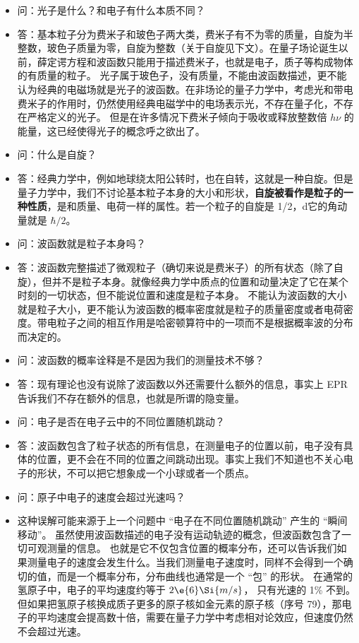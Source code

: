 \begin{itemize}
\item 问：光子是什么？和电子有什么本质不同？
\item 答：基本粒子分为费米子和玻色子两大类，费米子有不为零的质量，自旋为半整数，玻色子质量为零，自旋为整数（关于自旋见下文）。在量子场论诞生以前，薛定谔方程和波函数只能用于描述费米子，也就是电子，质子等构成物体的有质量的粒子。 光子属于玻色子，没有质量，不能由波函数描述，更不能认为经典的电磁场就是光子的波函数。在非场论的量子力学中，考虑光和带电费米子的作用时，仍然使用经典电磁学中的电场表示光，不存在量子化，不存在严格定义的光子。 但是在许多情况下费米子倾向于吸收或释放整数倍 $h\nu$ 的能量，这已经使得光子的概念呼之欲出了。
\item 问：什么是自旋？
\item 答：经典力学中，例如地球绕太阳公转时，也在自转，这就是一种自旋。但是量子力学中，我们不讨论基本粒子本身的大小和形状，\textbf{自旋被看作是粒子的一种性质}，是和质量、电荷一样的属性。若一个粒子的自旋是 1/2，d它的角动量就是 $\hbar/2$。
\item 问：波函数就是粒子本身吗？
\item 答：波函数完整描述了微观粒子（确切来说是费米子）的所有状态（除了自旋），但并不是粒子本身。就像经典力学中质点的位置和动量决定了它在某个时刻的一切状态，但不能说位置和速度是粒子本身。 不能认为波函数的大小就是粒子大小，更不能认为波函数的概率密度就是粒子的质量密度或者电荷密度。带电粒子之间的相互作用是哈密顿算符中的一项而不是根据概率波的分布而决定的。

\item 问：波函数的概率诠释是不是因为我们的测量技术不够？

\item 答：现有理论也没有说除了波函数以外还需要什么额外的信息，事实上 EPR 告诉我们不存在额外的信息，也就是所谓的隐变量。

\item 问：电子是否在电子云中的不同位置随机跳动？

\item 答：波函数包含了粒子状态的所有信息，在测量电子的位置以前，电子没有具体的位置，更不会在不同的位置之间跳动出现。事实上我们不知道也不关心电子的形状，不可以把它想象成一个小球或者一个质点。

\item 问：原子中电子的速度会超过光速吗？

\item 这种误解可能来源于上一个问题中 “电子在不同位置随机跳动” 产生的 “瞬间移动”。 虽然使用波函数描述的电子没有运动轨迹的概念，但波函数包含了一切可观测量的信息。 也就是它不仅包含位置的概率分布，还可以告诉我们如果测量电子的速度会发生什么。当我们测量电子速度时，同样不会得到一个确切的值，而是一个概率分布，分布曲线也通常是一个 “包” 的形状。 在通常的氢原子中，电子的平均速度约等于 $2\e{6}\Si{m/s}$， 只有光速的 1\% 不到。 但如果把氢原子核换成质子更多的原子核如金元素的原子核（序号 79），那电子的平均速度会提高数十倍，需要在量子力学中考虑相对论效应，但速度仍然不会超过光速。


\end{itemize}
